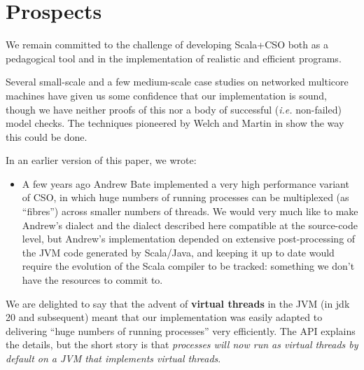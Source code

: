 \documentclass[12pt]{IOS-Book-Article-CPA-2017}
\begin{document}



\section{Prospects}

We remain committed to the challenge of developing Scala+CSO both
as a pedagogical tool and in the implementation of realistic
and efficient programs.

Several small-scale and a few medium-scale case studies on networked
multicore machines have given us some confidence that our implementation
is sound, though we have neither proofs of this nor a body of
successful (\textit{i.e.} non-failed) model checks. The techniques
pioneered by Welch and Martin in \cite{welchandmartin} show the way
this could be done.

In an earlier version of this paper, we wrote:
\begin{itemize}\item[]
A few years ago Andrew Bate implemented a very high performance
variant of CSO, in which huge numbers of running processes can be
multiplexed (as ``fibres'') across smaller numbers of threads. We
would very much like to make Andrew's dialect and the dialect
described here compatible at the source-code level, but Andrew's
implementation depended on extensive post-processing of the JVM
code generated by Scala/Java, and keeping it up to date would require
the evolution of the Scala compiler to be tracked: something we 
don't have the resources to commit to.
\end{itemize}

We are delighted to say that the advent of \textbf{virtual threads}
in the JVM (in jdk 20 and subsequent) meant that our implementation
was easily adapted to delivering ``huge numbers of running processes''
very efficiently. The API explains the details, but the short story
is that \textit{processes will now run as virtual threads by default
on a JVM that implements virtual threads}.
\end{document}
